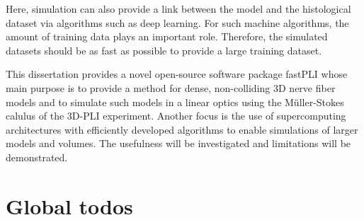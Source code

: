 Here, simulation can also provide a link between the model and the histological dataset via algorithms such as deep learning.
For such machine algorithms, the amount of training data plays an important role.
Therefore, the simulated datasets should be as fast as possible to provide a large training dataset.
\par
%
This dissertation provides a novel open-source software package \ac{fastPLI} whose main purpose is to provide a method for dense, non-colliding 3D nerve fiber models and to simulate such models in a linear optics using the M\"{u}ller-Stokes calulus of the \ac{3D-PLI} experiment.
Another focus is the use of supercomputing architectures with efficiently developed algorithms to enable simulations of larger models and volumes.
The usefulness will be investigated and limitations will be demonstrated.
% 


\section{Global todos}
%
\cite{Angles2019}\\
\cite{Callaghan2019}\\
%
